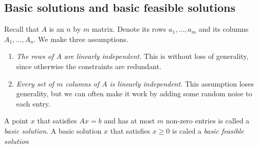 \documentclass{../template/note}
\begin{document}
    \subsection{Basic solutions and basic feasible solutions}

    Recall that $A$ is an $n$ by $m$ matrix. Denote its rows $a_1, \dots, a_m$ and its columns $A_1, \dots, A_n$. We make three assumptions.
    \begin{enumerate}[label=\protect\circled{\arabic*}]
        \item \emph{The rows of $A$ are linearly independent.} This is without loss of generality, since otherwise the constraints are redundant.
        \item \emph{Every set of $m$ columns of $A$ is linearly independent}. This assumption loses generality, but we can often make it work by adding some random noise to each entry.
    \end{enumerate}
    
    \begin{definition}
        A point $x$ that satisfies $Ax = b$ and has at most $m$ non-zero entries is called a \emph{basic solution}. A basic solution $x$ that satisfies $x \geq 0$ is caled a \emph{basic feasible solution}
    \end{definition}
    
\end{document}
